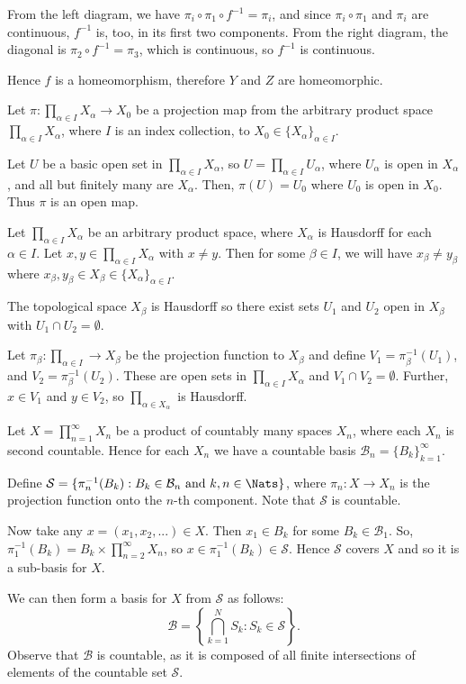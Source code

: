 \documentclass{homework651}
\newcommand\ra{\rightarrow}
\newcommand\calB{\mathcal{B}}
\newcommand\calS{\mathcal{S}}
\begin{document}
\begin{aproblems}
From the left diagram,
we have $\pi_i \circ \pi_1 \circ f^{-1} = \pi_i$, and since $\pi_i\circ\pi_1$
and $\pi_i$ are continuous, $f^{-1}$ is, too, in its first two components.
From the right diagram, the diagonal is $\pi_2\circ f^{-1}=\pi_3$, which is
continuous, so $f^{-1}$ is continuous.

Hence $f$ is a homeomorphism, therefore $Y$ and $Z$ are homeomorphic.

\newpage

\subsol
Let $\pi: \prod_{\alpha\in I} X_\alpha \ra X_0$ be a projection map from
the arbitrary product space $\prod_{\alpha\in I} X_\alpha$, where $I$ is an index
collection, to $X_0\in\{X_\alpha\}_{\alpha\in I}$.

Let $U$ be a basic open set in $\prod_{\alpha\in I} X_\alpha$,
so $U=\prod_{\alpha\in I} U_\alpha$,
where $U_\alpha$ is open in $X_\alpha$, and all but finitely many
are $X_\alpha$.  Then, $\pi(U)=U_0$ where $U_0$
is open in $X_0$.  Thus $\pi$ is an open map.

\subsol
Let $\prod_{\alpha\in I} X_\alpha$ be an arbitrary product space,
where $X_\alpha$ is
Hausdorff for each $\alpha\in I$.  Let $x,y\in\prod_{\alpha\in I} X_\alpha$
with $x\ne y$.
Then for some $\beta\in I$, we will have $x_\beta\ne y_\beta$ where
$x_\beta,y_\beta\in X_\beta\in\{X_\alpha\}_{\alpha\in I}$.

The topological space $X_\beta$ is Hausdorff so there exist sets $U_1$ and
$U_2$ open in $X_\beta$ with $U_1\cap U_2=\emptyset$.

Let $\pi_\beta:\prod_{\alpha\in I}\ra X_\beta$ be the projection function
to $X_\beta$ and define 
$V_1= \pi_\beta^{-1}(U_1)$,
and
$V_2=\pi_\beta^{-1}(U_2)$.
These are open sets
in $\prod_{\alpha\in I} X_\alpha$ and $V_1\cap V_2=\emptyset$.  Further,
$x\in V_1$ and $y\in V_2$, so $\prod_{\alpha\in X_\alpha}$ is Hausdorff.

\vspace{.3in}

\subsol
Let $X=\prod_{n=1}^{\infty} X_n$ be a product of countably many spaces
$X_n$, where each $X_n$ is second countable.  Hence for each $X_n$ we have
a countable basis $\calB_n=\{B_k\}_{k=1}^{\infty}$.

Define $\calS=\{\pi_n^{-1}(B_k):B_k\in\calB_n \text{ and } k,n\in\Nats\}$,
where $\pi_n:X\ra X_n$ is the projection function onto the $n$-th component.
Note that $\calS$ is countable.

Now take any $x=(x_1,x_2,...)\in X$.  Then $x_1\in B_k$
for some $B_k\in\calB_1$.  So, $\pi_1^{-1}(B_k)=B_k\times\prod_{n=2}^{\infty} X_n$,
so $x\in \pi_1^{-1}(B_k)\in\calS$.  Hence $\calS$ covers $X$ and so it
is a sub-basis for $X$.

We can then form a basis for $X$ from $\calS$ as follows:
$$ \calB = \left\{ \bigcap_{k=1}^{N} S_k : S_k\in\calS\right\}.$$
Observe that $\calB$ is countable, as it is composed of all finite intersections
of elements of the countable set $\calS$.

\end{aproblems}
\end{document}
